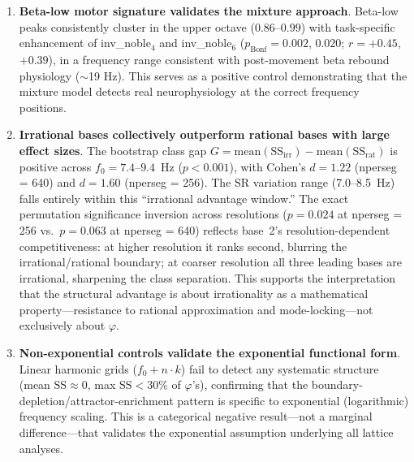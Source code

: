 \documentclass[11pt,a4paper]{article}
\newcommand{\phisym}{\varphi}
\newcommand{\fzero}{f_0}
\begin{document}
\begin{enumerate}
    \item \textbf{Beta-low motor signature validates the mixture approach}. Beta-low peaks consistently cluster in the upper octave ($0.86$--$0.99$) with task-specific enhancement of inv\_noble$_4$ and inv\_noble$_6$ ($p_{\text{Bonf}} = 0.002$, $0.020$; $r = +0.45$, $+0.39$), in a frequency range consistent with post-movement beta rebound physiology ($\sim$19 Hz). This serves as a positive control demonstrating that the mixture model detects real neurophysiology at the correct frequency positions.

    \item \textbf{Irrational bases collectively outperform rational bases with large effect sizes}. The bootstrap class gap $G = \text{mean}(\text{SS}_{\text{irr}}) - \text{mean}(\text{SS}_{\text{rat}})$ is positive across $\fzero = 7.4$--$9.4$~Hz ($p < 0.001$), with Cohen's $d = 1.22$ (nperseg = 640) and $d = 1.60$ (nperseg = 256). The SR variation range (7.0--8.5~Hz) falls entirely within this ``irrational advantage window.'' The exact permutation significance inversion across resolutions ($p = 0.024$ at nperseg = 256 vs.\ $p = 0.063$ at nperseg = 640) reflects base~2's resolution-dependent competitiveness: at higher resolution it ranks second, blurring the irrational/rational boundary; at coarser resolution all three leading bases are irrational, sharpening the class separation. This supports the interpretation that the structural advantage is about irrationality as a mathematical property---resistance to rational approximation and mode-locking---not exclusively about $\phisym$.

    \item \textbf{Non-exponential controls validate the exponential functional form}. Linear harmonic grids ($\fzero + n \cdot k$) fail to detect any systematic structure (mean $\text{SS} \approx 0$, max $\text{SS} < 30\%$ of $\phisym$'s), confirming that the boundary-depletion/attractor-enrichment pattern is specific to exponential (logarithmic) frequency scaling. This is a categorical negative result---not a marginal difference---that validates the exponential assumption underlying all lattice analyses.
\end{enumerate}
\end{document}
